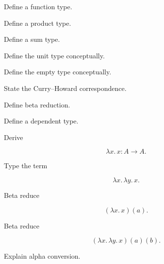 \begin{exercise}[1]
Define a function type.
\end{exercise}

\begin{exercise}[1]
Define a product type.
\end{exercise}

\begin{exercise}[1]
Define a sum type.
\end{exercise}

\begin{exercise}[1]
Define the unit type conceptually.
\end{exercise}

\begin{exercise}[1]
Define the empty type conceptually.
\end{exercise}

\begin{exercise}[1]
State the Curry--Howard correspondence.
\end{exercise}

\begin{exercise}[1]
Define beta reduction.
\end{exercise}

\begin{exercise}[1]
Define a dependent type.
\end{exercise}

\begin{exercise}[2]
Derive

\[
\lambda x.\,x:A\to A.
\]
\end{exercise}

\begin{exercise}[2]
Type the term

\[
\lambda x.\,\lambda y.\,x.
\]
\end{exercise}

\begin{exercise}[2]
Beta reduce

\[
(\lambda x.\,x)(a).
\]
\end{exercise}

\begin{exercise}[2]
Beta reduce

\[
(\lambda x.\,\lambda y.\,x)(a)(b).
\]
\end{exercise}

\begin{exercise}[3]
Explain alpha conversion.
\end{exercise}


